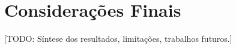 
\chapter{Considerações Finais}
\label{cap:conclusao}

[TODO: Síntese dos resultados, limitações, trabalhos futuros.]


